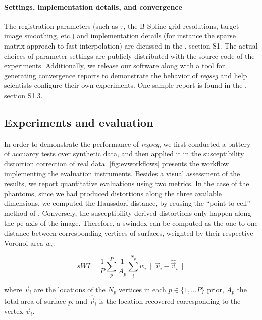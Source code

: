 \paragraph*{Settings, implementation details, and convergence}
\label{sec:conv_report}
The registration parameters (such as $\tau$, the B-Spline grid resolutions,
  target image smoothing, etc.) and implementation details (for instance the sparse matrix approach
  to fast interpolation) are dicussed in the \suppl{}, section S1.
The actual choices of parameter settings are publicly distributed with the source code of the experiments.
Additionally, we release our software along with a tool for generating convergence reports to
  demonstrate the behavior of \emph{regseg} and help scientists configure their own experiments.
One sample report is found in the \suppl{}, section S1.3.


\subsection*{Experiments and evaluation}
\label{sec:experiments_evaluation}
%
In order to demonstrate the performance of \emph{regseg}, we first conducted a battery of
  accuarcy tests over synthetic data, and then applied it in the susceptibility distortion
  correction of real data.
\autoref{fig:evworkflows} presents the workflow implementing the evaluation instruments.
Besides a visual assessment of the results, we report quantitative evaluations using
  two metrics.
In the case of the phantoms, since we had produced distortions along the three
  available dimensions, we computed the Haussdorf distance, by reusing the
  ``point-to-cell'' method of \cite{commandeur_vtk_2011}.
Conversely, the susceptibility-derived distortions only happen along the \gls*{pe}
  axis of the image.
Therefore, a \gls*{swindex} can be computed as the one-to-one distance between corresponding
  vertices of surfaces, weighted by their respective Voronoi area $w_i$:

  \begin{equation}
  sWI = \frac{1}{P} \sum\limits_p^P \frac{1}{A_p} \sum\limits_i^{N_p} w_i\,\|
  \vec{v}_i - \hat{\vec{v}}_i \|
  \label{eq:swindex}
  \end{equation}

  where $\vec{v}_i$ are the locations of the $N_p$ vertices in each $p \in \{1, \dots P\}$
  prior, $A_p$ the total area of surface $p$, and $\hat{\vec{v}}_i$ is the location
  recovered corresponding to the vertex $\vec{v}_i$.


